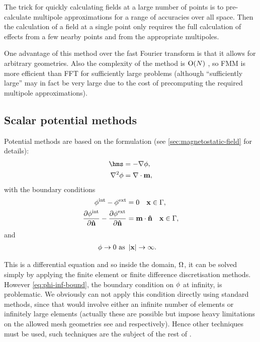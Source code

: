 The trick for quickly calculating fields at a large number of points is to pre-calculate multipole approximations for a range of accuracies over all space.
Then the calculation of a field at a single point only requires the full calculation of effects from a few nearby points and from the appropriate multipoles.

One advantage of this method over the fast Fourier transform is that it allows for arbitrary geometries.
Also the complexity of the method is $\text{O}{\left( N \right)}$ \cite{Chang2011}, so FMM is more efficient than FFT for sufficiently large problems (although ``sufficiently large'' may in fact be very large due to the cost of precomputing the required multipole approximations).


\subsection{Scalar potential methods}
\label{sec:magstat-field-calc-pote}

Potential methods are based on the formulation (see \cref{sec:magnetostatic-field} for details):
\begin{equation}
  \begin{aligned}
    \label{eq:Hms2}
    \hms &= - \nabla \phim, \\
    \lap \phim &= \nabla \cdot \mv,
  \end{aligned}
\end{equation}
with the boundary conditions
\begin{equation}
  \begin{aligned}
    \label{eq:cont-phi-bound2}
    \phi^{\text{int}} - \phi^{\text{ext}} &= 0 \quad \mathbf{x} \in {\Gamma}, \\
    \frac{\partial \phi^{\text{int}}}{\partial \mathbf{\hat{n}}} - \frac{\partial \phi^{\text{ext}}}{\partial \mathbf{\hat{n}}} &= \mathbf{m} \cdot \mathbf{\hat{n}} \quad \mathbf{x} \in {\Gamma}, \\
  \end{aligned}
\end{equation}
and
\begin{equation}
  \begin{aligned}
    \label{eq:phi-inf-bound}
    \phi \rightarrow 0 \text{ as } &\left|{\mathbf{x}} \right| \rightarrow \infty.
  \end{aligned}
\end{equation}

This is a differential equation and so inside the domain, $\Omega$, it can be solved simply by applying the finite element or finite difference discretisation methods.
However \cref{eq:phi-inf-bound}, the boundary condition on $\phi$ at infinity, is problematic.
We obviously can not apply this condition directly using standard methods, since that would involve either an infinite number of elements or infinitely large elements (actually these are  possible but impose heavy limitations on the allowed mesh geometries see \eg \cite{Alouges2001} and \cite{Fidler2000} respectively).
Hence other techniques must be used, such techniques are the subject of the rest of .

